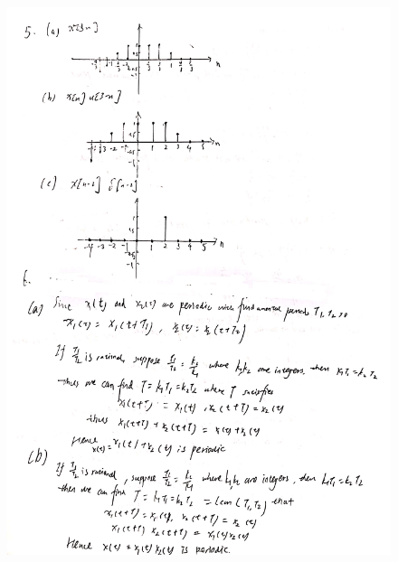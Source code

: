 \documentclass[a4paper]{article}
\begin{document}
\begin{figure}[H]
  \begin{center}
    \includegraphics[width=1\textwidth]{5-6(b).jpg}
  \end{center}
\end{figure}
\end{document}
